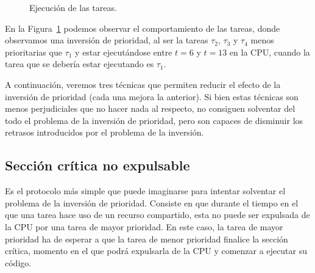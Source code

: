 \begin{ejemplo}
\begin{figure}[H]
        \caption{Ejecución de las tareas.}
        \label{fig:inv_prioridad}
    \end{figure}
    En la Figura~\ref{fig:inv_prioridad} podemos observar el comportamiento de las tareas, donde observamos una inversión de prioridad, al ser la tareas $\tau_2$, $\tau_3$ y $\tau_4$ menos prioritarias que $\tau_1$ y estar ejecutándose entre $t=6$ y $t=13$ en la CPU, cuando la tarea que se debería estar ejecutando es $\tau_1$.
\end{ejemplo}

\noindent
A continuación, veremos tres técnicas que permiten reducir el efecto de la inversión de prioridad (cada una mejora la anterior). Si bien estas técnicas son menos perjudiciales que no hacer nada al respecto, no consiguen solventar del todo el problema de la inversión de prioridad, pero son capaces de disminuir los retrasos introducidos por el problema de la inversión.

\subsection{Sección crítica no expulsable}
Es el protocolo más simple que puede imaginarse para intentar solventar el problema de la inversión de prioridad. Consiste en que durante el tiempo en el que una tarea hace uso de un recurso compartido, esta no puede ser expulsada de la CPU por una tarea de mayor prioridad. En este caso, la tarea de mayor prioridad ha de esperar a que la tarea de menor prioridad finalice la sección crítica, momento en el que podrá expulsarla de la CPU y comenzar a ejecutar su código.

